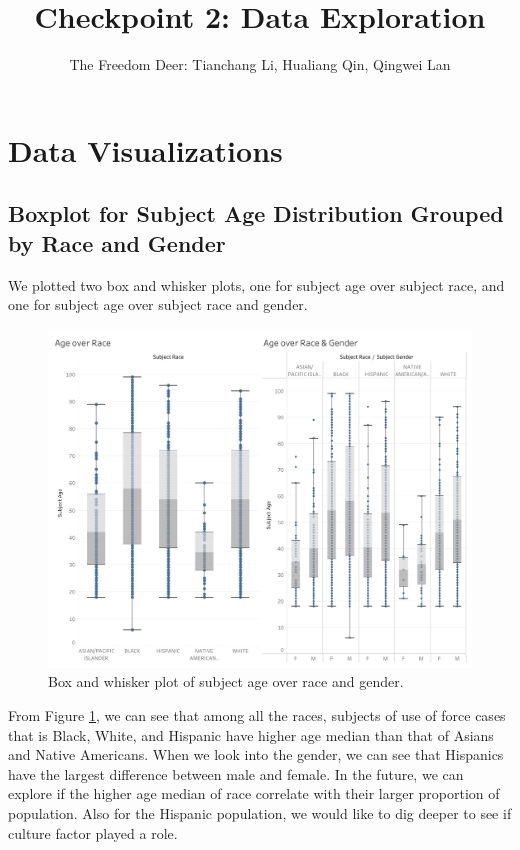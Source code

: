\documentclass[10pt]{article}
\title{Checkpoint 2: Data Exploration}
\author{The Freedom Deer: Tianchang Li, Hualiang Qin, Qingwei Lan}
\begin{document}
\maketitle

\section{Data Visualizations}

\subsection{Boxplot for Subject Age Distribution Grouped by Race and Gender}

We plotted two box and whisker plots, one for subject age over subject race, and one for subject age over subject race and gender.

\begin{figure}[h]
\centering
\includegraphics[scale=0.30]{image1.png}
\caption{Box and whisker plot of subject age over race and gender.}
\label{fig:subjage}
\end{figure}

From Figure \ref{fig:subjage}, we can see that among all the races, subjects of use of force cases that is Black, White, and Hispanic have higher age median than that of Asians and Native Americans. When we look into the gender, we can see that Hispanics have the largest difference between male and female. In the future, we can explore if the higher age median of race correlate with their larger proportion of population. Also for the Hispanic population, we would like to dig deeper to see if culture factor played a role.
\end{document}
